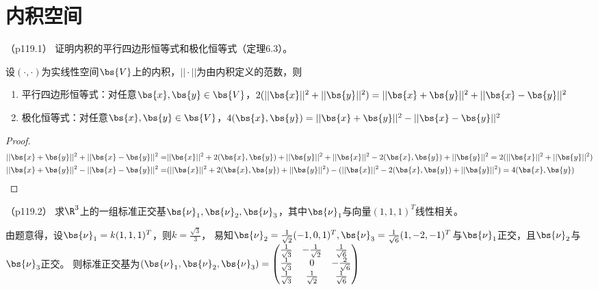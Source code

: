 \documentclass[12pt, a4paper, oneside, UTF8]{ctexbook}
\begin{document}
\else
\fi

\chapter{内积空间}
\begin{question}（p119.1）
    证明内积的平行四边形恒等式和极化恒等式（定理6.3）。

    设$(\cdot,\cdot)$为实线性空间$\bs{V}$上的内积，$||\cdot||$为由内积定义的范数，则
    \begin{enumerate}[label=(\arabic*)]
        \item 平行四边形恒等式：对任意$\bs{x},\bs{y} \in \bs{V}$，$2(||\bs{x}||^2+||\bs{y}||^2)=||\bs{x}+\bs{y}||^2+||\bs{x}-\bs{y}||^2$
        \item 极化恒等式：对任意$\bs{x},\bs{y} \in \bs{V}$，$4(\bs{x},\bs{y})=||\bs{x}+\bs{y}||^2-||\bs{x}-\bs{y}||^2$
    \end{enumerate}
\end{question}

\begin{proof}
    \begin{align*}
        ||\bs{x}+\bs{y}||^2+||\bs{x}-\bs{y}||^2=&||\bs{x}||^2+2(\bs{x},\bs{y})+||\bs{y}||^2
        +||\bs{x}||^2-2(\bs{x},\bs{y})+||\bs{y}||^2=2(||\bs{x}||^2+||\bs{y}||^2) \\
        ||\bs{x}+\bs{y}||^2-||\bs{x}-\bs{y}||^2=&(||\bs{x}||^2+2(\bs{x},\bs{y})+||\bs{y}||^2)
        -(||\bs{x}||^2-2(\bs{x},\bs{y})+||\bs{y}||^2)=4(\bs{x},\bs{y})
    \end{align*}
\end{proof}

\begin{question}（p119.2）
    求$\R^3$上的一组标准正交基$\bs{\nu}_1,\bs{\nu}_2,\bs{\nu}_3$，其中$\bs{\nu}_1$与向量$(1,1,1)^T$线性相关。
\end{question}

\begin{solution}
    由题意得，设$\bs{\nu}_1=k(1,1,1)^T$，则$k=\frac{\sqrt{3}}{3}$，
    易知$\bs{\nu}_2=\frac{1}{\sqrt{2}}(-1,0,1)^T,\bs{\nu}_3=\frac{1}{\sqrt{6}}(1,-2,-1)^T$与$\bs{\nu}_1$正交，且$\bs{\nu}_2$与$\bs{\nu}_3$正交。
    则标准正交基为$(\bs{\nu}_1,\bs{\nu}_2,\bs{\nu}_3)=\begin{pmatrix}
        \frac{1}{\sqrt{3}} & -\frac{1}{\sqrt{2}} & \frac{1}{\sqrt{6}} \\
        \frac{1}{\sqrt{3}} & 0& -\frac{2}{\sqrt{6}} \\
        \frac{1}{\sqrt{3}} & \frac{1}{\sqrt{2}}& \frac{1}{\sqrt{6}}
    \end{pmatrix}$
\end{solution}
\end{document}
